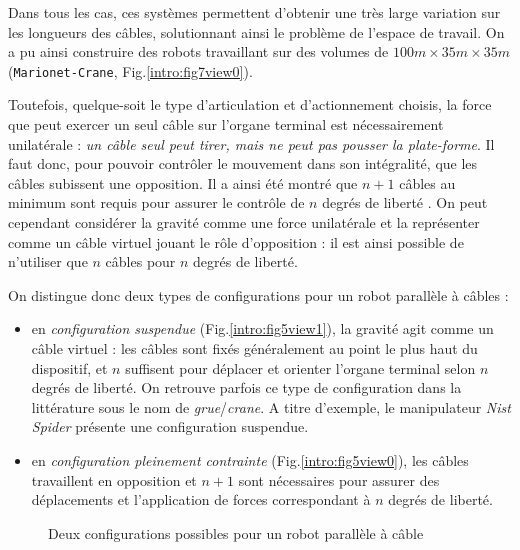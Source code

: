 Dans tous les cas, ces systèmes permettent d'obtenir une très large variation 
sur les longueurs des câbles, solutionnant ainsi le problème de l'espace de 
travail. On a pu ainsi construire des robots travaillant sur des volumes de
$100m\times35m\times35m$ ({\tt Marionet-Crane}, \cite{merlet2010} 
Fig.\ref{intro:fig7view0}).

Toutefois, quelque-soit le type d'articulation et d'actionnement choisis, la 
force que peut exercer un seul câble sur l'organe terminal est nécessairement 
unilatérale : {\em un câble seul peut tirer, mais ne peut pas pousser la 
plate-forme}. Il faut donc, pour pouvoir contrôler le mouvement dans son 
intégralité, que les câbles subissent une opposition. Il a ainsi été montré que 
$n+1$ câbles au minimum sont requis pour assurer le contrôle de $n$ degrés de 
liberté \cite{1994:Ming.Higuchi}. On peut cependant considérer la gravité comme 
une force unilatérale et la représenter comme un câble virtuel jouant le rôle 
d'opposition : il est ainsi possible de n'utiliser que $n$ câbles pour $n$ 
degrés de liberté.

On distingue donc deux types de configurations pour un robot parallèle à câbles 
:
\begin{itemize}
 \item en {\it configuration suspendue} (Fig.\ref{intro:fig5view1}), la gravité 
agit comme un câble virtuel : les câbles sont fixés généralement au point le 
plus haut du dispositif, et $n$ suffisent pour déplacer et orienter l'organe 
terminal selon $n$ degrés de liberté. On retrouve parfois ce type de 
configuration dans la littérature sous le nom de {\it grue}/{\it crane}. A 
titre d'exemple, le manipulateur {\it Nist Spider} 
\cite{1992:Albus.Bostelman.ea} présente une configuration suspendue.
 \item en {\it configuration pleinement contrainte} 
(Fig.\ref{intro:fig5view0}), 
les câbles travaillent en opposition et $n+1$ sont nécessaires pour assurer des 
déplacements et l'application de forces correspondant à $n$ degrés de liberté.
\end{itemize}

\begin{figure}[!ht]
  \centering
\hfill
    \caption{\footnotesize Deux configurations possibles pour un robot 
parallèle 
à câble}
\label{intro:fig5}
\end{figure}

